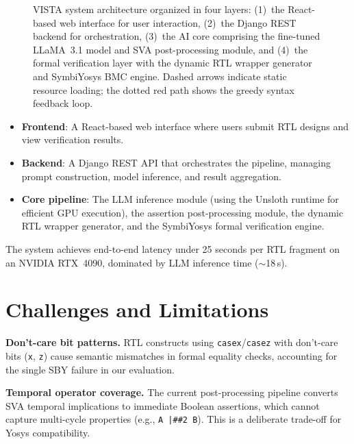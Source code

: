 \documentclass[conference]{IEEEtran}
\begin{document}
\begin{figure}[t]
\caption{VISTA system architecture organized in four layers: (1)~the React-based web interface for user interaction, (2)~the Django REST backend for orchestration, (3)~the AI core comprising the fine-tuned LLaMA~3.1 model and SVA post-processing module, and (4)~the formal verification layer with the dynamic RTL wrapper generator and SymbiYosys BMC engine. Dashed arrows indicate static resource loading; the dotted red path shows the greedy syntax feedback loop.}
\label{fig:architecture}
\end{figure}

\begin{itemize}
    \item \textbf{Frontend}: A React-based web interface where users submit RTL designs and view verification results.
    \item \textbf{Backend}: A Django REST API that orchestrates the pipeline, managing prompt construction, model inference, and result aggregation.
    \item \textbf{Core pipeline}: The LLM inference module (using the Unsloth runtime for efficient GPU execution), the assertion post-processing module, the dynamic RTL wrapper generator, and the SymbiYosys formal verification engine.
\end{itemize}

The system achieves end-to-end latency under 25 seconds per RTL fragment on an NVIDIA RTX~4090, dominated by LLM inference time ($\sim$18\,s).

\section{Challenges and Limitations}
\label{sec:limitations}

\textbf{Don't-care bit patterns.}
RTL constructs using \texttt{casex}/\texttt{casez} with don't-care bits (\texttt{x}, \texttt{z}) cause semantic mismatches in formal equality checks, accounting for the single SBY failure in our evaluation.

\textbf{Temporal operator coverage.}
The current post-processing pipeline converts SVA temporal implications to immediate Boolean assertions, which cannot capture multi-cycle properties (e.g., \texttt{A |\#\#2 B}). This is a deliberate trade-off for Yosys compatibility.
\end{document}
